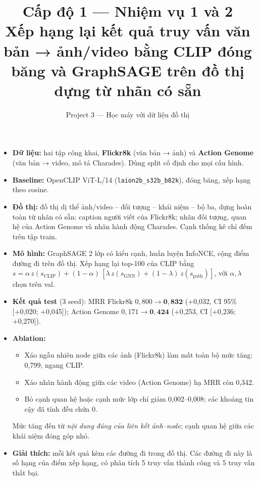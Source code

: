 \documentclass[11pt,a4paper]{article}
\title{\textbf{Cấp độ 1 — Nhiệm vụ 1 và 2}\\[4pt]
\large Xếp hạng lại kết quả truy vấn văn bản → ảnh/video bằng CLIP đóng băng và GraphSAGE trên đồ thị dựng từ nhãn có sẵn}
\author{Project 3 — Học máy với dữ liệu đồ thị}
\date{}
\begin{document}
\maketitle

\begin{tcolorbox}[colback=soft,colframe=accent,title=\textbf{Tóm tắt},fonttitle=\small,fontupper=\small]
\begin{itemize}[leftmargin=12pt]
  \item \textbf{Dữ liệu:} hai tập công khai, \textbf{Flickr8k} (văn bản → ảnh) và \textbf{Action Genome} (văn bản → video, mô tả Charades). Dùng split cố định cho mọi cấu hình.
  \item \textbf{Baseline:} OpenCLIP ViT-L/14 (\texttt{laion2b\_s32b\_b82k}), đóng băng, xếp hạng theo cosine.
  \item \textbf{Đồ thị:} đồ thị dị thể ảnh/video – đối tượng – khái niệm – bộ ba, dựng hoàn toàn từ nhãn có sẵn: caption người viết của Flickr8k; nhãn đối tượng, quan hệ của Action Genome và nhãn hành động Charades. Cạnh thống kê chỉ đếm trên tập train.
  \item \textbf{Mô hình:} GraphSAGE 2 lớp có kiểu cạnh, huấn luyện InfoNCE, cộng điểm đường đi trên đồ thị. Xếp hạng lại top-100 của CLIP bằng
  \(s=\alpha\,z(s_{\text{CLIP}})+(1-\alpha)\,[\lambda\,z(s_{\text{GNN}})+(1-\lambda)\,z(s_{\text{path}})]\), với \(\alpha,\lambda\) chọn trên val.
  \item \textbf{Kết quả test} (3 seed): MRR Flickr8k \(0{,}800 \to \mathbf{0{,}832}\) (+0,032, CI 95\% [+0,020; +0,045]); Action Genome \(0{,}171 \to \mathbf{0{,}424}\) (+0,253, CI [+0,236; +0,270]).
  \item \textbf{Ablation:}
  \begin{itemize}[leftmargin=12pt]
    \item Xáo ngẫu nhiên node giữa các ảnh (Flickr8k) làm mất toàn bộ mức tăng: 0,799, ngang CLIP.
    \item Xáo nhãn hành động giữa các video (Action Genome) hạ MRR còn 0,342.
    \item Bỏ cạnh quan hệ hoặc cạnh mức lớp chỉ giảm 0,002–0,008; các khoảng tin cậy đã tính đều chứa 0.
  \end{itemize}
  Mức tăng đến từ \emph{nội dung đúng của liên kết ảnh–node}; cạnh quan hệ giữa các khái niệm đóng góp nhỏ.
  \item \textbf{Giải thích:} mỗi kết quả kèm các đường đi trong đồ thị. Các đường đi này là số hạng của điểm xếp hạng, có phân tích 5 truy vấn thành công và 5 truy vấn thất bại.
\end{itemize}
\end{tcolorbox}
\end{document}
